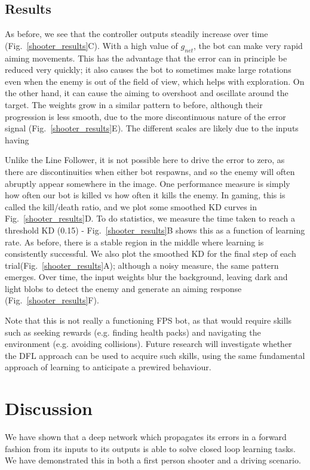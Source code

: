 \documentclass{llncs}
\begin{document}
\subsection{Results}
As before, we see that the controller outputs steadily increase over
time (Fig.~\ref{shooter_results}C). With a high value of $g_{net}$,
the bot can make very rapid aiming movements. This has the advantage
that the error can in principle be reduced very quickly; it also
causes the bot to sometimes make large rotations even when the enemy
is out of the field of view, which helps with exploration. On the
other hand, it can cause the aiming to overshoot and oscillate around
the target.  The weights grow in a similar pattern to before, although
their progression is less smooth, due to the more discontinuous nature
of the error signal (Fig.~\ref{shooter_results}E). The different scales are likely due to the inputs having 

Unlike the Line Follower, it is not possible here to drive the error
to zero, as there are discontinuities when either bot respawns, and so
the enemy will often abruptly appear somewhere in the image. One
performance measure is simply how often our bot is killed vs how often
it kills the enemy. In gaming, this is called the kill/death ratio,
and we plot some smoothed KD curves in Fig.~\ref{shooter_results}D. To
do statistics, we measure the time taken to reach a threshold KD (0.15) -
Fig.~\ref{shooter_results}B shows this as a function of learning
rate. As before, there is a stable region in the middle where learning
is consistently successful. We also plot the smoothed KD for the final
step of each trial(Fig.~\ref{shooter_results}A); although a noisy
measure, the same pattern emerges. Over time, the input weights blur
the background, leaving dark and light blobs to detect the enemy and
generate an aiming response (Fig.~\ref{shooter_results}F).

Note that this is not really a functioning FPS bot, as that would
require skills such as seeking rewards (e.g. finding health packs) and navigating the
environment (e.g. avoiding collisions). Future research will investigate whether the DFL approach
can be used to acquire such skills, using the same fundamental
approach of learning to anticipate a prewired behaviour.


\section{Discussion}
We have shown that a deep network which propagates its errors in a forward
fashion from its inputs to its outputs is able to solve closed loop
learning tasks. We have demonstrated this in both a first person
shooter and a driving scenario.
\end{document}
